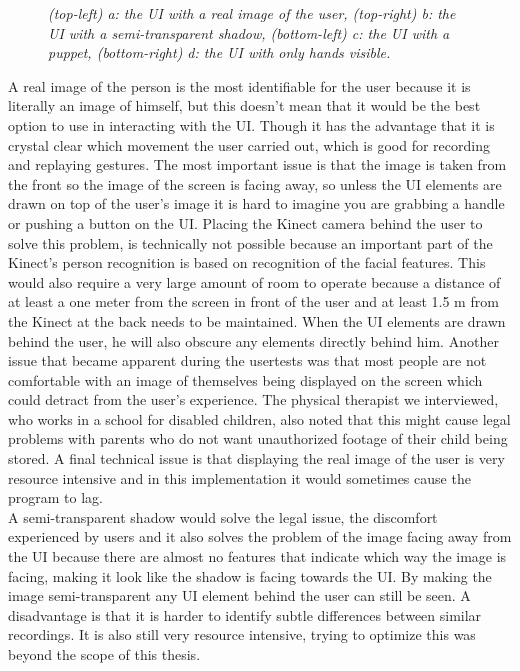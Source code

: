 \begin{figure}[H]
\begin{center}
 		\caption{\emph{(top-left) a: the UI with a real image of the user, (top-right) b: the UI with a semi-transparent shadow, (bottom-left) c: the UI with a puppet, (bottom-right) d: the UI with only hands visible. }}
 		\label{user visualizations}
 	\end{center}
 \end{figure}
 
 
A real image of the person is the most identifiable for the user because it is literally an image of himself, but this doesn't mean that it would be the best option to use in interacting with the UI. Though it has the advantage that it is crystal clear which movement the user carried out, which is good for recording and replaying gestures. The most important issue is that the image is taken from the front so the image of the screen is facing away, so unless the UI elements are drawn on top of the user's image it is hard to imagine you are grabbing a handle or pushing a button on the UI. Placing the Kinect camera behind the user to solve this problem, is technically not possible because an important part of the Kinect's person recognition is based on recognition of the facial features. This would also require a very large amount of room to operate because a distance of at least a one meter from the screen in front of the user and at least 1.5 m from the Kinect at the back needs to be maintained. When the UI elements are drawn behind the user, he will also obscure any elements directly behind him. Another issue that became apparent during the usertests was that most people are not comfortable with an image of themselves being displayed on the screen which could detract from the user's experience. The physical therapist we interviewed, who works in a school for disabled children, also noted that this might cause legal problems with parents who do not want unauthorized footage of their child being stored. A final technical issue is that displaying the real image of the user is very resource intensive and in this implementation it would sometimes cause the program to lag.\\
 
A semi-transparent shadow would solve the legal issue, the discomfort experienced by users and it also solves the problem of the image facing away from the UI because there are almost no features that indicate which way the image is facing, making it look like the shadow is facing towards the UI. By making the image semi-transparent any UI element behind the user can still be seen. A disadvantage is that it is harder to identify subtle differences between similar recordings. It is also still very resource intensive, trying to optimize this was beyond the scope of this thesis.\\
 
